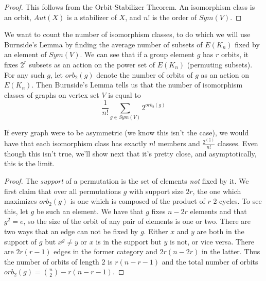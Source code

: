 

\begin{proof}
	This follows from the Orbit-Stabilizer Theorem.  An isomorphism class is an orbit, $Aut(X)$ is a stabilizer of $X$, and $n!$ is the order of $Sym(V)$.
\end{proof}

We want to count the number of isomorphism classes, to do which we will use Burnside's Lemma by finding the average number of subsets of $E(K_n)$ fixed by an element of $Sym(V)$.  We can see that if a group element $g$ has $r$ orbits, it fixes $2^r$ subsets as an action on the power set of $E(K_n)$ (permuting subsets).  For any such $g$, let $orb_2(g)$ denote the number of orbits of $g$ as an action on $E(K_n)$.  Then Burnside's Lemma tells us that the number of isomorphism classes of graphs on vertex set $V$ is equal to $$\frac{1}{n!}\sum\limits_{g\in Sym(V)} 2^{orb_2(g)}$$

If every graph were to be asymmetric (we know this isn't the case), we would have that each isomorphism class has exactly $n!$ members and $\frac{2^{\binom{n}{2}}}{n!}$ classes.  Even though this isn't true, we'll show next that it's pretty close, and asymptotically, this is the limit.


\begin{proof}
	
	The \textit{support} of a permutation is the set of elements \textit{not} fixed by it.  We first claim that over all permutations $g$ with support size $2r$, the one which maximizes $orb_2(g)$ is one which is composed of the product of $r$ $2$-cycles.  To see this, let $g$ be such an element.  We have that $g$ fixes $n-2r$ elements and that $g^2=e$, so the size of the orbit of any pair of elements is one or two.  There are two ways that an edge can not be fixed by $g$.  Either $x$ and $y$ are both in the support of $g$ but $x^g\neq y$ or $x$ is in the support but $y$ is not, or vice versa.  There are $2r(r-1)$ edges in the former category and $2r(n-2r)$ in the latter.  Thus the number of orbits of length $2$ is $r(n-r-1)$ and the total number of orbits $orb_2(g)=\binom{n}{2}-r(n-r-1)$.
	
	
\end{proof}


\ifdraft


\fi

